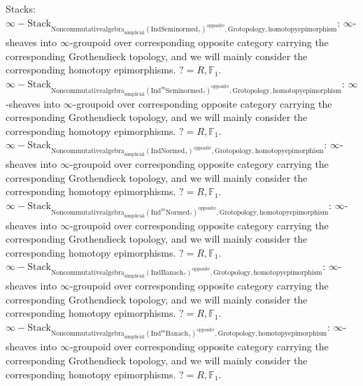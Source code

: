 \documentclass[11pt]{book}
\theoremstyle{definition}
\numberwithin{equation}{section}
\begin{document}
 
\noindent Stacks:\\
 
 \noindent $\infty-\mathrm{Stack}_{\mathrm{Noncommutativealgebra}_{\mathrm{simplicial}}(\mathrm{Ind}\mathrm{Seminormed}_?)^\mathrm{opposite},\mathrm{Grotopology,homotopyepimorphism}}$: $\infty$-sheaves into $\infty$-groupoid over corresponding opposite category carrying the corresponding Grothendieck topology, and we will mainly consider the corresponding homotopy epimorphisms. $?=R,\mathbb{F}_1$.\\
\noindent $\infty-\mathrm{Stack}_{\mathrm{Noncommutativealgebra}_{\mathrm{simplicial}}(\mathrm{Ind}^m\mathrm{Seminormed}_?)^\mathrm{opposite},\mathrm{Grotopology,homotopyepimorphism}}$: $\infty$-sheaves into $\infty$-groupoid over corresponding opposite category carrying the corresponding Grothendieck topology, and we will mainly consider the corresponding homotopy epimorphisms. $?=R,\mathbb{F}_1$.\\
\noindent $\infty-\mathrm{Stack}_{\mathrm{Noncommutativealgebra}_{\mathrm{simplicial}}(\mathrm{Ind}\mathrm{Normed}_?)^\mathrm{opposite},\mathrm{Grotopology,homotopyepimorphism}}$: $\infty$-sheaves into $\infty$-groupoid over corresponding opposite category carrying the corresponding Grothendieck topology, and we will mainly consider the corresponding homotopy epimorphisms. $?=R,\mathbb{F}_1$.\\
\noindent $\infty-\mathrm{Stack}_{\mathrm{Noncommutativealgebra}_{\mathrm{simplicial}}(\mathrm{Ind}^m\mathrm{Normed}_?)^\mathrm{opposite},\mathrm{Grotopology,homotopyepimorphism}}$: $\infty$-sheaves into $\infty$-groupoid over corresponding opposite category carrying the corresponding Grothendieck topology, and we will mainly consider the corresponding homotopy epimorphisms. $?=R,\mathbb{F}_1$.\\
\noindent $\infty-\mathrm{Stack}_{\mathrm{Noncommutativealgebra}_{\mathrm{simplicial}}(\mathrm{Ind}\mathrm{Banach}_?)^\mathrm{opposite},\mathrm{Grotopology,homotopyepimorphism}}$: $\infty$-sheaves into $\infty$-groupoid over corresponding opposite category carrying the corresponding Grothendieck topology, and we will mainly consider the corresponding homotopy epimorphisms. $?=R,\mathbb{F}_1$.\\
\noindent $\infty-\mathrm{Stack}_{\mathrm{Noncommutativealgebra}_{\mathrm{simplicial}}(\mathrm{Ind}^m\mathrm{Banach}_?)^\mathrm{opposite},\mathrm{Grotopology,homotopyepimorphism}}$: $\infty$-sheaves into $\infty$-groupoid over corresponding opposite category carrying the corresponding Grothendieck topology, and we will mainly consider the corresponding homotopy epimorphisms. $?=R,\mathbb{F}_1$.\\
\end{document}
